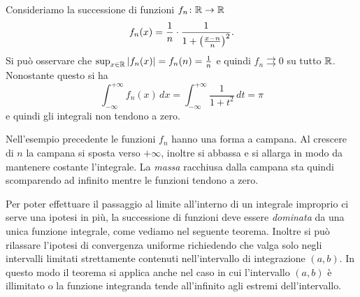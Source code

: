 \begin{example}\label{ex:convergenza_non_dominata}
  Consideriamo la successione di funzioni $f_n\colon {\mathbb R}\to{\mathbb R}$
  \[
    f_n(x) = \frac 1 n \cdot \frac{1}{1+{\left( \frac{x-n} n \right)}^2}.
  \]
  Si può osservare che $\sup_{x\in {\mathbb R}} {\left|f_n(x)\right|} = f_n(n) = \frac 1 n$ 
  e quindi $f_n \rightrightarrows 0$ su tutto ${\mathbb R}$. 
  Nonostante questo si ha 
  \[
  \int_{-\infty}^{+\infty} f_n(x) \, dx  
  = \int_{-\infty}^{+\infty} \frac{1}{1+t^2}\, dt = \pi
  \]
  e quindi gli integrali non tendono a zero.
\end{example}
%
Nell'esempio precedente le funzioni $f_n$ hanno una forma a campana. 
Al crescere di $n$ la campana si sposta verso $+\infty$, inoltre si abbassa e si 
allarga in modo da mantenere costante l'integrale. 
La \emph{massa} racchiusa dalla campana sta quindi scomparendo ad infinito 
mentre le funzioni tendono a zero.

Per poter effettuare il passaggio al limite all'interno di un integrale 
improprio ci serve una ipotesi in più, la successione di funzioni 
deve essere \emph{dominata} da una unica funzione integrale, 
come vediamo nel seguente teorema. 
Inoltre si può rilassare l'ipotesi di convergenza uniforme 
richiedendo che valga solo negli intervalli  
limitati strettamente contenuti nell'intervallo di integrazione $(a,b)$. 
In questo modo il teorema si applica anche nel caso in cui l'intervallo $(a,b)$
è illimitato o la funzione integranda tende all'infinito agli estremi 
dell'intervallo.

